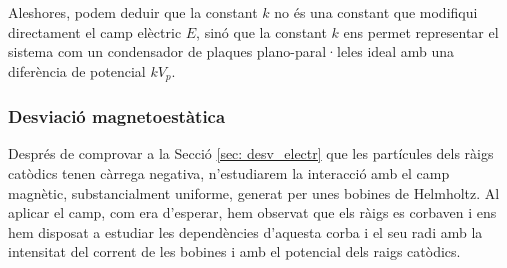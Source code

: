 \documentclass[11pt]{article}
\numberwithin{equation}{section}
\numberwithin{figure}{section}
\numberwithin{table}{section}
\begin{document}
Aleshores, podem deduir que la constant $k$ no és una constant que modifiqui directament el camp elèctric $E$, sinó que la constant $k$ ens permet representar el sistema com un condensador de plaques plano-paral·leles ideal amb una diferència de potencial $k V_p$. 

\subsubsection{Desviació magnetoestàtica}\label{sec: desv_magn}
Després de comprovar a la Secció \ref{sec: desv_electr} que les partícules dels ràigs catòdics tenen càrrega negativa, n'estudiarem la interacció amb el camp magnètic, substancialment uniforme, generat per unes bobines de Helmholtz. 
Al aplicar el camp, com era d'esperar, hem observat que els ràigs es corbaven i ens hem disposat a estudiar les dependències d'aquesta corba i el seu radi amb la intensitat del corrent de les bobines i amb el potencial dels raigs catòdics.
\end{document}
